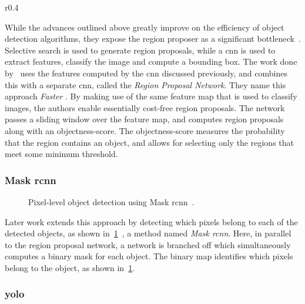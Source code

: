 \documentclass[\rootfolder/main.tex]{subfiles}
\begin{document}
\begin{wrapfigure}{r}{0.4\columnwidth}
    \caption[Object detection using Faster \acrshort{rcnn}.]{Object detection using \acrshort{rcnn}~\cite{Ren2017}.}
    \label{fig:faster-rcnn}
\end{wrapfigure}

While the advances outlined above greatly improve on the efficiency of object detection algorithms, they expose the region proposer as a significant bottleneck~\cite{Ren2017}.
Selective search is used to generate region proposals, while a \acrshort{cnn} is used to extract features, classify the image and compute a bounding box.
The work done by~\cite{Ren2017} uses the features computed by the \acrshort{cnn} discussed previously, and combines this with a separate \acrshort{cnn}, called the \emph{Region Proposal Network}.
They name this approach \emph{Faster }.
By making use of the same feature map that is used to classify images, the authors enable essentially cost-free region proposals.
The network passes a sliding window over the feature map, and computes region proposals along with an objectness-score.
The objectness-score measures the probability that the region contains an object, and allows for selecting only the regions that meet some minimum threshold.

\subsubsection{Mask \acrshort{rcnn}}

\begin{figure}[H]
    \caption[Pixel-level object detection using Mask \acrshort{rcnn}.]{Pixel-level object detection using Mask \acrshort{rcnn}~\cite{He2017}.}
    \label{fig:mask-rcnn}
\end{figure}

Later work extends this approach by detecting which pixels belong to each of the detected objects, as shown in~\cref{fig:mask-rcnn}~\cite{He2017}, a method named \emph{Mask \acrshort{rcnn}}.
Here, in parallel to the region proposal network, a network is branched off which simultaneously computes a binary mask for each object.
The binary map identifies which pixels belong to the object, as shown in~\cref{fig:mask-rcnn}.

\subsubsection{\acrfull{yolo}}
\end{document}
